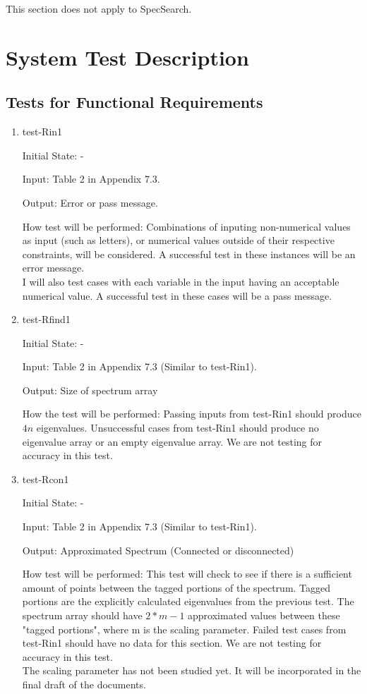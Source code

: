 \documentclass[12pt, titlepage]{article}
\begin{document}
This section does not apply to SpecSearch. 

\section{System Test Description}
	
\subsection{Tests for Functional Requirements}

\begin{enumerate}
\item{test-Rin1\\}	
				
Initial State: -
					
Input: Table 2 in Appendix 7.3.
					
Output: Error or pass message.
					
How test will be performed: Combinations of inputing non-numerical values as 
input  (such as letters), or numerical values outside of their respective 
constraints, will be considered. A successful test in these instances will be 
an error message. \\
I will also test cases with each variable in the input having an 
acceptable numerical value. A successful test in these cases will be a pass 
message. 
					
\item{test-Rfind1} 

Initial State: - 

Input: Table 2 in Appendix 7.3 (Similar to test-Rin1).

Output: Size of spectrum array 

How the test will be performed: Passing inputs from test-Rin1 should produce 
$4n$ eigenvalues. Unsuccessful cases 
from test-Rin1 should produce no eigenvalue array 
or an empty eigenvalue array. We are not testing for accuracy in this test.

\item{test-Rcon1} 

Initial State: -

Input: Table 2 in Appendix 7.3 (Similar to test-Rin1).

Output: Approximated Spectrum (Connected or disconnected)

How test will be performed: This test will check to see if there is a 
sufficient amount of points between the tagged portions of the spectrum. Tagged 
portions are the explicitly calculated eigenvalues from the previous test. The 
spectrum array should have $2*m-1$ approximated values between these "tagged 
portions", where m is the scaling parameter. 
Failed test cases from test-Rin1 should have no data for this section. 
We are not testing for accuracy in this test.\\
 The scaling parameter has not 
been studied yet. It will be incorporated in the final draft of the documents.


\end{enumerate}
\end{document}
